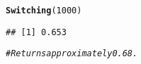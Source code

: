 \documentclass[12pt,letter]{article}\usepackage[]{graphicx}\usepackage[]{color}
\makeatletter
\newcommand{\hlnum}[1]{\textcolor[rgb]{0.686,0.059,0.569}{#1}}%
\newcommand{\hlcom}[1]{\textcolor[rgb]{0.678,0.584,0.686}{\textit{#1}}}%
\newcommand{\hlstd}[1]{\textcolor[rgb]{0.345,0.345,0.345}{#1}}%
\newcommand{\hlkwd}[1]{\textcolor[rgb]{0.737,0.353,0.396}{\textbf{#1}}}%
\newenvironment{kframe}{%
 \def\at@end@of@kframe{}%
 \ifinner\ifhmode%
  \def\at@end@of@kframe{\end{minipage}}%
  \begin{minipage}{\columnwidth}%
 \fi\fi%
 \def\FrameCommand##1{\hskip\@totalleftmargin \hskip-\fboxsep
 \colorbox{shadecolor}{##1}\hskip-\fboxsep
     \hskip-\linewidth \hskip-\@totalleftmargin \hskip\columnwidth}%
 \MakeFramed {\advance\hsize-\width
   \@totalleftmargin\z@ \linewidth\hsize
   \@setminipage}}%
 {\par\unskip\endMakeFramed%
 \at@end@of@kframe}
\newenvironment{knitrout}{}{} %
\makeatother
\begin{document}
\begin{knitrout}
\begin{kframe}
\begin{alltt}
\hlkwd{Switching}\hlstd{(}\hlnum{1000}\hlstd{)}
\end{alltt}
\begin{verbatim}
## [1] 0.653
\end{verbatim}
\begin{alltt}
\hlcom{# Returns approximately 0.68.}
\end{alltt}
\end{kframe}
\end{knitrout}
\end{document}
